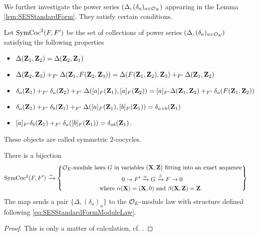 \documentclass[../main.tex]{subfiles}
\begin{document}
We further investigate the power series $(\Delta, (\delta_a)_{a\in \mathcal{O}_E})$
appearing in the Lemma \ref{lem:SESStandardForm}. They satisfy certain conditions.
\begin{defi}\label{def:SymCoc2}
  Let $\operatorname{SymCoc}^2(F, F')$ be the set of collections of power series $(\Delta,
  (\delta_a)_{a \in \mathcal{O}_E})$ satisfying the following properties
  \begin{itemize}
    \item $\Delta(\mathbf{Z}_1,\mathbf{Z}_2) = \Delta(\mathbf{Z}_2,\mathbf{Z}_1)$
    \item $\Delta(\mathbf{Z}_2,\mathbf{Z}_3) +_{F'} \Delta(\mathbf{Z}_1, F(\mathbf{Z}_2,\mathbf{Z}_3)) =
      \Delta(F(\mathbf{Z}_1,\mathbf{Z}_2), \mathbf{Z}_3) +_{F'} \Delta(\mathbf{Z}_1,\mathbf{Z}_2)$
    \item $\delta_a(\mathbf{Z}_1) +_{F'} \delta_a(\mathbf{Z}_2) +_{F'} \Delta([a]_F(\mathbf{Z}_1),
      [a]_F(\mathbf{Z}_2)) = 
      [a]_{F'}\Delta(\mathbf{Z}_1,\mathbf{Z}_2) +_{F'} \delta_a(F(\mathbf{Z}_1,\mathbf{Z}_2))$
    \item $\delta_a(\mathbf{Z}_1) +_{F'} \delta_b(\mathbf{Z}_1) +_{F'} \Delta([a]_F(\mathbf{Z}_1),
      [b]_F(\mathbf{Z}_1)) =
      \delta_{a+b}(\mathbf{Z}_1)$
    \item $[a]_{F'}\delta_b(\mathbf{Z}_1) +_{F'} \delta_a([b]_F(\mathbf{Z}_1)) = \delta_{ab}(\mathbf{Z}_1)$.
  \end{itemize}
  These objects are called symmetric $2$-cocycles. 
\end{defi}
\begin{prop}\label{prop:ClassOfFGLitoSymCoc}
  There is a bijection 
  \begin{equation*}
    \operatorname{SymCoc}^2(F, F') \xrightarrow{\sim} \left\{
      \begin{gathered}
        \text{$\mathcal{O}_E$-module laws $G$ in variables $(\mathbf{X},\mathbf{Z})$ fitting into an
        exact sequence}
        \\ 0 \to F' \xrightarrow{\alpha} G \xrightarrow{\beta} F \to 0 \\
        \text{where $\alpha(\mathbf{X}) = (\mathbf{X}, 0)$ and $\beta(\mathbf{X}, \mathbf{Z}) = \mathbf{Z}$. }
      \end{gathered}
      \right\}
  \end{equation*}
  The map sends a pair $\{\Delta, (\delta_a)_a\}$ to the $\mathcal{O}_E$-module law with
  structure defined following \eqref{eq:SESStandardFormModuleLaw}. 
  \begin{proof}[Proof]
    This is only a matter of calculation, cf. \cite[
    6]{hopkins1994equivariant}.
  \end{proof}
\end{prop}
\end{document}
